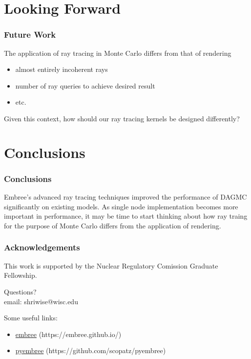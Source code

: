 \documentclass[12pt]{beamer}
\begin{document}
\section{Looking Forward} %

\begin{frame}

\frametitle{Future Work}

The application of ray tracing in Monte Carlo differs from that of rendering
  \begin{itemize}
    \item almost entirely incoherent rays
    \item number of ray queries to achieve desired result
    \item etc.
  \end{itemize}
Given this context, how should our ray tracing kernels be designed differently?

\end{frame}


\section{Conclusions}

\begin{frame}
\frametitle{Conclusions}

Embree's advanced ray tracing techniques improved the performance of DAGMC significantly on existing models. 
\vfill
As single node implementation becomes more important in performance, it may be time to start thinking about how ray traing for the purpose of Monte Carlo differs from the application of rendering.
\vfill

\end{frame}

\begin{frame}
  \frametitle{Acknowledgements}
  \begin{center}
    This work is supported by the Nuclear Regulatory Comission Graduate Fellowship.
    \end{center}
\end{frame}

\begin{frame}

\begin{center}
\vfill
\huge {Questions?} \\
\vfill
\normalsize email: shriwise@wisc.edu
\vfill
\end{center}
\normalsize
Some useful links:
\begin{itemize}
\item \href{https://embree.github.io/}{{\color{blue}embree}} (https://embree.github.io/)
\item \href{https://github.com/scopatz/pyembree}{{\color{blue}pyembree}} (https://github.com/scopatz/pyembree)
\end{itemize}

\end{frame}
\end{document}
